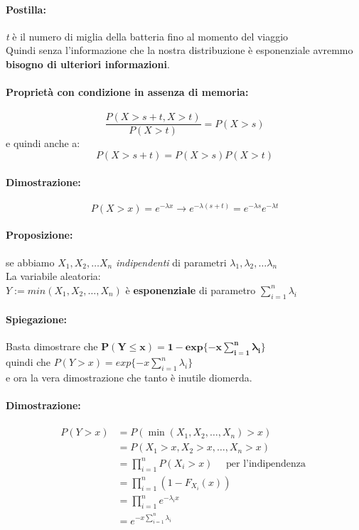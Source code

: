 \documentclass[]{article}
\begin{document}
    \paragraph{Postilla:} \textit{t} è il numero di miglia della batteria fino al momento del viaggio \\
    Quindi senza l'informazione che la nostra distribuzione è esponenziale avremmo \textbf{bisogno di ulteriori informazioni}.


    \paragraph{Proprietà con condizione in assenza di memoria:}
    \[ \frac{P(X > s + t, X > t)}{P(X > t)} = P(X > s) \]
    e quindi anche a:
    \[ P(X > s + t) = P(X > s) P(X > t) \]
    \paragraph{Dimostrazione:}
    \[ P(X > x) = e^{-\lambda x} \rightarrow e^{-\lambda(s+t)} = e^{-\lambda s} e^{-\lambda t} \]

    \paragraph{Proposizione:} se abbiamo $X_1, X_2, \ldots X_n$ \textit{indipendenti} di parametri $\lambda_1, \lambda_2, \ldots \lambda_n$ \\
    La variabile aleatoria: \\
    $Y := min(X_1, X_2, \ldots, X_n)$ è \textbf{esponenziale} di parametro $\sum_{i = 1}^{n} \lambda_i$ \\
    \paragraph{Spiegazione:} Basta dimostrare che $\boldsymbol{P(Y \leq x) = 1 - exp\{-x \sum_{i = 1}^{n} \lambda_i \}}$ \\
    quindi che $P(Y > x) = exp\{-x \sum_{i = 1}^{n} \lambda_i \}$ \\ 
    e ora la vera dimostrazione che tanto è inutile diomerda.

    \paragraph{Dimostrazione:}
    \begin{equation}
        \begin{aligned}
            P(Y>x) & =P\left(\min \left(X_1, X_2, \ldots, X_n\right)>x\right) \\
            & =P\left(X_1>x, X_2>x, \ldots, X_n>x\right) \\
            & =\prod_{i=1}^n P\left(X_i>x\right) \quad \text { per l'indipendenza } \\
            & =\prod_{i=1}^n\left(1-F_{X_i}(x)\right) \\
            & =\prod_{i=1}^n e^{-\lambda_i x} \\
            & =e^{-x \sum_{i=1}^n \lambda_i}
        \end{aligned}
    \end{equation}
\end{document}
